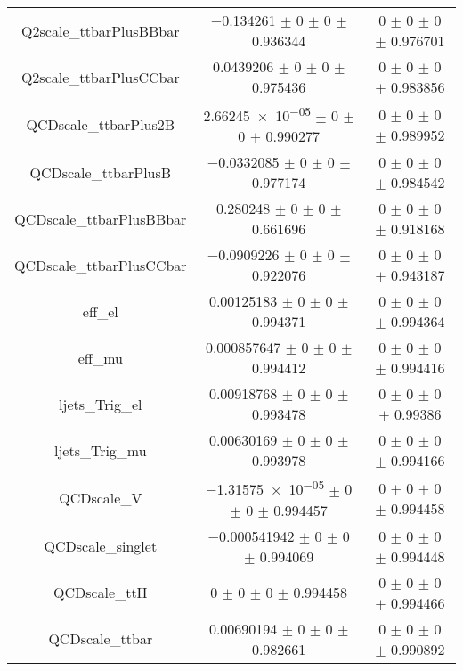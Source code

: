 \begin{table}
\begin{tabular}{ccc}
Q2scale\_ttbarPlusBBbar & \num{-0.134261} $\pm$ \num{0} $\pm$ \num{0} $\pm$ \num{0.936344} & \num{0} $\pm$ \num{0} $\pm$ \num{0} $\pm$ \num{0.976701}\\
Q2scale\_ttbarPlusCCbar & \num{0.0439206} $\pm$ \num{0} $\pm$ \num{0} $\pm$ \num{0.975436} & \num{0} $\pm$ \num{0} $\pm$ \num{0} $\pm$ \num{0.983856}\\
QCDscale\_ttbarPlus2B & \num{2.66245e-05} $\pm$ \num{0} $\pm$ \num{0} $\pm$ \num{0.990277} & \num{0} $\pm$ \num{0} $\pm$ \num{0} $\pm$ \num{0.989952}\\
QCDscale\_ttbarPlusB & \num{-0.0332085} $\pm$ \num{0} $\pm$ \num{0} $\pm$ \num{0.977174} & \num{0} $\pm$ \num{0} $\pm$ \num{0} $\pm$ \num{0.984542}\\
QCDscale\_ttbarPlusBBbar & \num{0.280248} $\pm$ \num{0} $\pm$ \num{0} $\pm$ \num{0.661696} & \num{0} $\pm$ \num{0} $\pm$ \num{0} $\pm$ \num{0.918168}\\
QCDscale\_ttbarPlusCCbar & \num{-0.0909226} $\pm$ \num{0} $\pm$ \num{0} $\pm$ \num{0.922076} & \num{0} $\pm$ \num{0} $\pm$ \num{0} $\pm$ \num{0.943187}\\
eff\_el & \num{0.00125183} $\pm$ \num{0} $\pm$ \num{0} $\pm$ \num{0.994371} & \num{0} $\pm$ \num{0} $\pm$ \num{0} $\pm$ \num{0.994364}\\
eff\_mu & \num{0.000857647} $\pm$ \num{0} $\pm$ \num{0} $\pm$ \num{0.994412} & \num{0} $\pm$ \num{0} $\pm$ \num{0} $\pm$ \num{0.994416}\\
ljets\_Trig\_el & \num{0.00918768} $\pm$ \num{0} $\pm$ \num{0} $\pm$ \num{0.993478} & \num{0} $\pm$ \num{0} $\pm$ \num{0} $\pm$ \num{0.99386}\\
ljets\_Trig\_mu & \num{0.00630169} $\pm$ \num{0} $\pm$ \num{0} $\pm$ \num{0.993978} & \num{0} $\pm$ \num{0} $\pm$ \num{0} $\pm$ \num{0.994166}\\
QCDscale\_V & \num{-1.31575e-05} $\pm$ \num{0} $\pm$ \num{0} $\pm$ \num{0.994457} & \num{0} $\pm$ \num{0} $\pm$ \num{0} $\pm$ \num{0.994458}\\
QCDscale\_singlet & \num{-0.000541942} $\pm$ \num{0} $\pm$ \num{0} $\pm$ \num{0.994069} & \num{0} $\pm$ \num{0} $\pm$ \num{0} $\pm$ \num{0.994448}\\
QCDscale\_ttH & \num{0} $\pm$ \num{0} $\pm$ \num{0} $\pm$ \num{0.994458} & \num{0} $\pm$ \num{0} $\pm$ \num{0} $\pm$ \num{0.994466}\\
QCDscale\_ttbar & \num{0.00690194} $\pm$ \num{0} $\pm$ \num{0} $\pm$ \num{0.982661} & \num{0} $\pm$ \num{0} $\pm$ \num{0} $\pm$ \num{0.990892}\\

\end{tabular}
\end{table}
